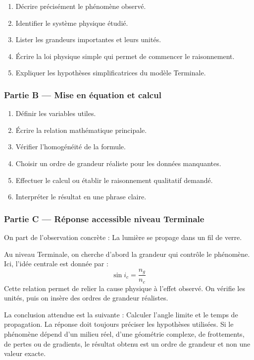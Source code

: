 \documentclass[11pt,a4paper]{article}
\begin{document}
\begin{enumerate}
  \item Décrire précisément le phénomène observé.
  \item Identifier le système physique étudié.
  \item Lister les grandeurs importantes et leurs unités.
  \item Écrire la loi physique simple qui permet de commencer le raisonnement.
  \item Expliquer les hypothèses simplificatrices du modèle Terminale.
\end{enumerate}

\subsubsection*{Partie B — Mise en équation et calcul}

\begin{enumerate}
  \item Définir les variables utiles.
  \item Écrire la relation mathématique principale.
  \item Vérifier l'homogénéité de la formule.
  \item Choisir un ordre de grandeur réaliste pour les données manquantes.
  \item Effectuer le calcul ou établir le raisonnement qualitatif demandé.
  \item Interpréter le résultat en une phrase claire.
\end{enumerate}

\subsubsection*{Partie C — Réponse accessible niveau Terminale}

\begin{corrigebox}
On part de l'observation concrète : La lumière se propage dans un fil de verre.

Au niveau Terminale, on cherche d'abord la grandeur qui contrôle le phénomène. Ici, l'idée centrale est donnée par :
\[
\sin i_c=\frac{n_g}{n_c}
\]
Cette relation permet de relier la cause physique à l'effet observé. On vérifie les unités, puis on insère des ordres de grandeur réalistes.

La conclusion attendue est la suivante : Calculer l'angle limite et le temps de propagation. La réponse doit toujours préciser les hypothèses utilisées. Si le phénomène dépend d'un milieu réel, d'une géométrie complexe, de frottements, de pertes ou de gradients, le résultat obtenu est un ordre de grandeur et non une valeur exacte.
\end{corrigebox}
\end{document}
